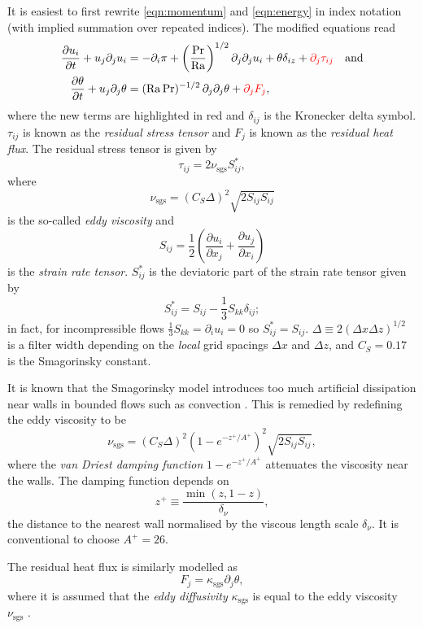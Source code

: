 \documentclass[../main.tex]{subfiles}
\begin{document}
It is easiest to first rewrite \cref{eqn:momentum} and \cref{eqn:energy} in
index notation (with implied summation over repeated indices). The modified
equations read
\begin{align}
    \label{eqn:momentum_idx}
    \frac{\partial u_i}{\partial t} + u_j \partial_j u_i
        &= -\partial_i \pi + \left(\frac{\mathrm{Pr}}{\mathrm{Ra}}\right)^{1/2}
            \partial_j \partial_j u_i + \theta \delta_{iz}
            + {\color{red} \partial_j \tau_{ij}} \quad \text{and} \\
    \label{eqn:energy_idx}
    \frac{\partial \theta}{\partial t} + u_j \partial_j \theta
        &= (\mathrm{Ra}\,\mathrm{Pr})^{-1/2} \, \partial_j \partial_j \theta
            + {\color{red} \partial_j F_j},
\end{align}
where the new terms are highlighted in red and $\delta_{ij}$ is the Kronecker
delta symbol. $\tau_{ij}$ is known as the \emph{residual stress tensor} and
$F_j$ is known as the \emph{residual heat flux}. The residual stress tensor is
given by
\[
    \tau_{ij} = 2 \nu_\mathrm{sgs} S_{ij}^*,
\]
where
\[
    \nu_\mathrm{sgs} = (C_S \Delta)^2 \sqrt{2 S_{ij} S_{ij}}
\]
is the so-called \emph{eddy viscosity} and
\[
    S_{ij} = \frac{1}{2} \left(
        \frac{\partial u_i}{\partial x_j} + \frac{\partial u_j}{\partial x_i}
    \right)
\]
is the \emph{strain rate tensor}. $S_{ij}^*$ is the deviatoric part of the
strain rate tensor given by
\[
    S_{ij}^* = S_{ij} - \frac{1}{3} S_{kk} \delta_{ij};
\]
in fact, for incompressible flows $\frac{1}{3} S_{kk} = \partial_i u_i = 0$ so
$S_{ij}^* = S_{ij}$. $\Delta \equiv 2 (\Delta x \Delta z)^{1/2}$ is
a filter width depending on the \emph{local} grid spacings $\Delta x$ and
$\Delta z$, and $C_S = 0.17$ is the Smagorinsky constant.

It is known that the Smagorinsky model introduces too much artificial
dissipation near walls in bounded flows such as \rb{} convection
\parencite{pope2000}. This is remedied by redefining the eddy viscosity to be
\[
    \nu_\mathrm{sgs}
        = (C_S \Delta)^2 (1 - e^{-z^+/A^+})^2 \sqrt{2 S_{ij} S_{ij}},
\]
where the \emph{van Driest damping function} $1 - e^{-z^+/A^+}$ attenuates
the viscosity near the walls. The damping function depends on
\[
    z^+ \equiv \frac{\min(z,1-z)}{\delta_\nu},
\]
the distance to the nearest wall normalised by the viscous length scale
$\delta_\nu$. It is conventional to choose $A^+ = 26$.

The residual heat flux is similarly modelled as
\[
    F_j = \kappa_\mathrm{sgs} \partial_j \theta,
\]
where it is assumed that the \emph{eddy diffusivity}
$\kappa_\mathrm{sgs}$ is equal to the eddy viscosity $\nu_\mathrm{sgs}$
\parencite[as in][, for example]{vreugdenhil2018}.
\end{document}

